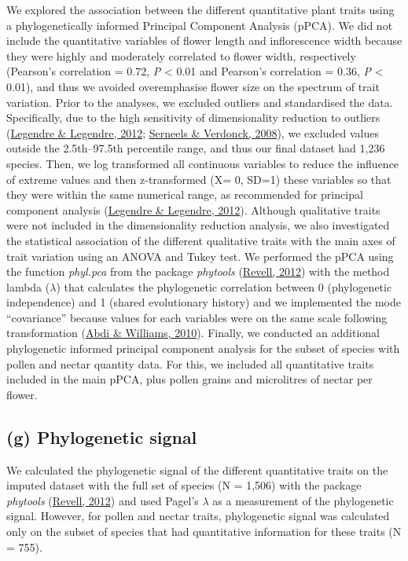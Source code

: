 \documentclass[
  12pt,
  a4paper,
]{article}
\begin{document}
We explored the association between the different quantitative plant traits using a phylogenetically informed Principal Component Analysis (pPCA). We did not include the quantitative variables of flower length and inflorescence width because they were highly and moderately correlated to flower width, respectively (Pearson's correlation = 0.72, \emph{P} \textless{} 0.01 and Pearson's correlation = 0.36, \emph{P} \textless{} 0.01), and thus we avoided overemphasise flower size on the spectrum of trait variation. Prior to the analyses, we excluded outliers and standardised the data. Specifically, due to the high sensitivity of dimensionality reduction to outliers (\protect\hyperlink{ref-legendre2012}{Legendre \& Legendre, 2012}; \protect\hyperlink{ref-serneels2008}{Serneels \& Verdonck, 2008}), we excluded values outside the 2.5th--97.5th percentile range, and thus our final dataset had 1,236 species. Then, we log transformed all continuous variables to reduce the influence of extreme values and then z-transformed (X= 0, SD=1) these variables so that they were within the same numerical range, as recommended for principal component analysis (\protect\hyperlink{ref-legendre2012}{Legendre \& Legendre, 2012}). Although qualitative traits were not included in the dimensionality reduction analysis, we also investigated the statistical association of the different qualitative traits with the main axes of trait variation using an ANOVA and Tukey test. We performed the pPCA using the function \emph{phyl.pca} from the package \emph{phytools} (\protect\hyperlink{ref-revell2012}{Revell, 2012}) with the method lambda (\(\lambda\)) that calculates the phylogenetic correlation between 0 (phylogenetic independence) and 1 (shared evolutionary history) and we implemented the mode ``covariance'' because values for each variables were on the same scale following transformation (\protect\hyperlink{ref-abdi2010}{Abdi \& Williams, 2010}). Finally, we conducted an additional phylogenetic informed principal component analysis for the subset of species with pollen and nectar quantity data. For this, we included all quantitative traits included in the main pPCA, plus pollen grains and microlitres of nectar per flower.

\hypertarget{g-phylogenetic-signal}{%
\subsection{(g) Phylogenetic signal}\label{g-phylogenetic-signal}}

We calculated the phylogenetic signal of the different quantitative traits on the imputed dataset with the full set of species (N = 1,506) with the package \emph{phytools} (\protect\hyperlink{ref-revell2012}{Revell, 2012}) and used Pagel's \(\lambda\) as a measurement of the phylogenetic signal. However, for pollen and nectar traits, phylogenetic signal was calculated only on the subset of species that had quantitative information for these traits (N = 755).
\end{document}
